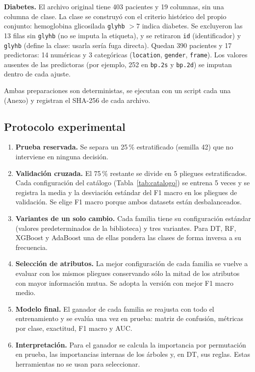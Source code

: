 \textbf{Diabetes.} El archivo original \cite{datosdiabetes} tiene 403 pacientes y 19
columnas, sin una columna de clase. La clase se construyó con el criterio histórico del
propio conjunto: hemoglobina glicosilada \texttt{glyhb} $>7$ indica diabetes. Se
excluyeron las 13 filas sin \texttt{glyhb} (no se imputa la etiqueta), y se retiraron
\texttt{id} (identificador) y \texttt{glyhb} (define la clase: usarla sería fuga
directa). Quedan 390 pacientes y 17 predictoras: 14 numéricas y 3 categóricas
(\texttt{location}, \texttt{gender}, \texttt{frame}). Los valores ausentes de las
predictoras (por ejemplo, 252 en \texttt{bp.2s} y \texttt{bp.2d}) se imputan dentro de
cada ajuste.

Ambas preparaciones son deterministas, se ejecutan con un script cada una (Anexo) y
registran el SHA-256 de cada archivo.

\subsection{Protocolo experimental}
\begin{enumerate}
\item \textbf{Prueba reservada.} Se separa un 25\,\% estratificado (semilla 42) que no
interviene en ninguna decisión.
\item \textbf{Validación cruzada.} El 75\,\% restante se divide en 5 pliegues
estratificados. Cada configuración del catálogo (Tabla~\ref{tab:catalogo}) se entrena
5 veces y se registra la media y la desviación estándar del F1 macro en los pliegues
de validación. Se elige F1 macro porque ambos datasets están desbalanceados.
\item \textbf{Variantes de un solo cambio.} Cada familia tiene su configuración estándar
(valores predeterminados de la biblioteca) y tres variantes. Para DT, RF, XGBoost y
AdaBoost una de ellas pondera las clases de forma inversa a su frecuencia.
\item \textbf{Selección de atributos.} La mejor configuración de cada familia se vuelve a
evaluar con los mismos pliegues conservando sólo la mitad de los atributos con mayor
información mutua. Se adopta la versión con mejor F1 macro medio.
\item \textbf{Modelo final.} El ganador de cada familia se reajusta con todo el
entrenamiento y se evalúa una vez en prueba: matriz de confusión, métricas por clase,
exactitud, F1 macro y AUC.
\item \textbf{Interpretación.} Para el ganador se calcula la importancia por permutación
en prueba, las importancias internas de los árboles y, en DT, sus reglas. Estas
herramientas no se usan para seleccionar.
\end{enumerate}
